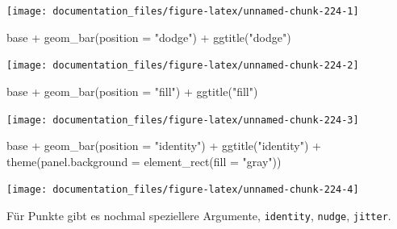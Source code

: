 \documentclass[
]{article}
\newenvironment{Shaded}{\begin{snugshade}}{\end{snugshade}}
\newcommand{\AttributeTok}[1]{\textcolor[rgb]{0.77,0.63,0.00}{#1}}
\newcommand{\FunctionTok}[1]{\textcolor[rgb]{0.00,0.00,0.00}{#1}}
\newcommand{\NormalTok}[1]{#1}
\newcommand{\SpecialCharTok}[1]{\textcolor[rgb]{0.00,0.00,0.00}{#1}}
\newcommand{\StringTok}[1]{\textcolor[rgb]{0.31,0.60,0.02}{#1}}
\begin{document}
\begin{center}\texttt{[image: documentation\_files/figure-latex/unnamed-chunk-224-1]} \end{center}

\begin{Shaded}
\begin{Highlighting}[]
\NormalTok{base }\SpecialCharTok{+} \FunctionTok{geom\_bar}\NormalTok{(}\AttributeTok{position =} \StringTok{"dodge"}\NormalTok{) }\SpecialCharTok{+} \FunctionTok{ggtitle}\NormalTok{(}\StringTok{"dodge"}\NormalTok{)}
\end{Highlighting}
\end{Shaded}

\begin{center}\texttt{[image: documentation\_files/figure-latex/unnamed-chunk-224-2]} \end{center}

\begin{Shaded}
\begin{Highlighting}[]
\NormalTok{base }\SpecialCharTok{+} \FunctionTok{geom\_bar}\NormalTok{(}\AttributeTok{position =} \StringTok{"fill"}\NormalTok{) }\SpecialCharTok{+} \FunctionTok{ggtitle}\NormalTok{(}\StringTok{"fill"}\NormalTok{)}
\end{Highlighting}
\end{Shaded}

\begin{center}\texttt{[image: documentation\_files/figure-latex/unnamed-chunk-224-3]} \end{center}

\begin{Shaded}
\begin{Highlighting}[]
\NormalTok{base }\SpecialCharTok{+} \FunctionTok{geom\_bar}\NormalTok{(}\AttributeTok{position =} \StringTok{"identity"}\NormalTok{) }\SpecialCharTok{+} \FunctionTok{ggtitle}\NormalTok{(}\StringTok{"identity"}\NormalTok{) }\SpecialCharTok{+}
  \FunctionTok{theme}\NormalTok{(}\AttributeTok{panel.background =} \FunctionTok{element\_rect}\NormalTok{(}\AttributeTok{fill =} \StringTok{"gray"}\NormalTok{))}
\end{Highlighting}
\end{Shaded}

\begin{center}\texttt{[image: documentation\_files/figure-latex/unnamed-chunk-224-4]} \end{center}

Für Punkte gibt es nochmal speziellere Argumente, \texttt{identity}, \texttt{nudge}, \texttt{jitter}.
\end{document}
